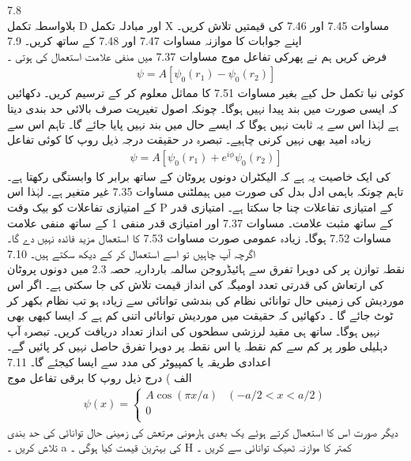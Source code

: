 7.8\\
بلاواسطہ تکمل D اور مبادلہ تکمل X مساوات 7.45 اور 7.46 کی قیمتیں تلاش کریں۔ اپنے جوابات کا موازنہ مساوات 7.47 اور 7.48 کے ساتھ کریں۔ 
7.9\\
فرض کریں ہم نے پھرکی تفاعل موج مساوات 7.37 میں منفی علامت استعمال کی ہوتی ۔
\begin{align}
\psi=A[\psi_{0}(r_{1})-\psi_{0}(r_{2})]
\end{align}
 کوئی نیا تکمل حل کیے بغیر مساوات 7.51 کا مماثل  معلوم کر کے ترسیم کریں۔ دکھائیں کہ ایسی صورت میں بند پیدا نہیں ہوگا۔ چونکہ اصول تغیریت صرف بالائی حد بندی دیتا ہے لہٰذا اس سے یہ ثابت نہیں ہوگا کہ ایسے حال میں بند نہیں پایا جائے گا۔ تاہم اس سے زیادہ امید بھی نہیں کرنی چاہیے۔ تبصرہ در حقیقت درجہ ذیل روپ کا کوئی تفاعل 
\begin{align}
\psi=A[\psi_{0}(r_{1})+e^{i\phi}\psi_{0}(r_{2})]
\end{align}
 کی ایک خاصیت یہ ہے کہ الیکٹران دونوں پروٹان کے ساتھ برابر کا وابستگی رکھتا ہے۔ تاہم چونکہ باہمی ادل بدل   کی صورت میں ہیملٹنی مساوات 7.35 غیر متغیر ہے۔ لہٰذا اس کے امتیازی تفاعلات کو بیک وقت P کے امتیازی تفاعلات چنا جا سکتا ہے۔ امتیازی قدر  کے ساتھ مثبت علامت۔ مساوات 7.37 اور امتیازی قدر منفی 1 کے ساتھ منفی علامت مساوات 7.52 ہوگا۔ زیادہ عمومی صورت مساوات 7.53 کا استعمال مزید فائدہ نہیں دے گا۔ اگرچہ آپ چاہیں تو اسے استعمال کر کے دیکھ سکتے ہیں۔
7.10\\
نقطہ توازن پر   کی دوہرا تفرق سے ہائیڈروجن سالمہ بارداریہ حصہ 2.3 میں دونوں پروٹان کی ارتعاش کی قدرتی تعدد اومیگہ کی انداز قیمت تلاش کی جا سکتی ہے۔ اگر اس موردیش کی زمینی حال توانائی     نظام کی بندشی توانائی سے زیادہ ہو تب نظام بکھر کر ٹوٹ جائے گا ۔ دکھائیں کہ حقیقت میں موردیش توانائی اتنی کم ہے کہ ایسا کبھی بھی نہیں ہوگا۔ ساتھ ہی مقید لرزشی سطحوں کی انداز تعداد دریافت کریں۔ تبصرہ 
آپ دہلیلی طور پر کم سے کم نقطہ یا اس نقطہ پر دوہرا تفرق حاصل نہیں کر پائیں گے۔ اعدادی طریقہ یا کمپیوٹر کی مدد سے ایسا کیجئے گا۔
7.11\\
الف ) درج ذیل روپ کا برقی تفاعل موج
\begin{align}
\psi(x)=\begin{cases} A\cos{(\pi x/a)} & (-a/2<x<a/2)\\
0\\
\end{cases} 
\end{align}
 دیگر صورت
اس کا استعمال کرتے ہوئے یک بعدی ہارمونی مرتعش کی زمینی حال توانائی کی حد بندی تلاش کریں ۔ a کی بہترین قیمت کیا ہوگی ۔ H کمتر کا موازنہ ٹھیک توانائی سے کریں ۔
